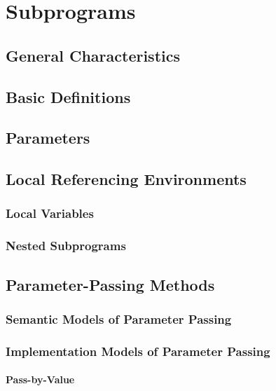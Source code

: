 \section{Subprograms}\label{sec:Subprograms}
\subsection{General Characteristics}\label{subsec:Suprogram_Characteristics}
\subsection{Basic Definitions}\label{subsec:Subprogram_Definitions}
\subsection{Parameters}\label{subsec:Subprogram_Parameters}
\subsection{Local Referencing Environments}\label{subsec:Local_Referencing_Environments}
\subsubsection{Local Variables}\label{subsubsec:Local_Variables}
\subsubsection{Nested Subprograms}\label{subsubsec:Nested_Subprograms}

\subsection{Parameter-Passing Methods}\label{subsec:Parameter_Passing_Methods}
\subsubsection{Semantic Models of Parameter Passing}\label{subsubsec:Semantic_Models_Parameter_Passing}
\subsubsection{Implementation Models of Parameter Passing}\label{subsubsec:Implementation_Models_Parameter_Passing}
\paragraph{Pass-by-Value}\label{par:Parameter_Passing-Pass_By_Value}
